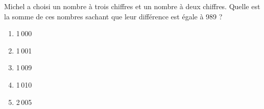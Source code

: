 Michel a choisi un nombre à trois chiffres et un nombre à deux chiffres. Quelle est la somme de ces nombres sachant que leur différence est égale à 989 ?
\begin{multicols}{5}
  \begin{enumerate}[A/]
  \item 1\,000
  \item 1\,001
  \item 1\,009
  \item 1\,010
  \item 2\,005
  \end{enumerate}
\end{multicols}